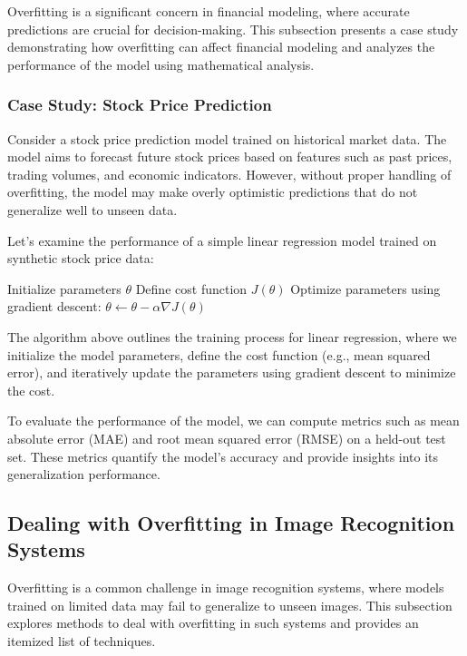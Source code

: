 \documentclass[12pt]{book} %
\begin{document}
Overfitting is a significant concern in financial modeling, where accurate predictions are crucial for decision-making. This subsection presents a case study demonstrating how overfitting can affect financial modeling and analyzes the performance of the model using mathematical analysis.

\subsubsection{Case Study: Stock Price Prediction}

Consider a stock price prediction model trained on historical market data. The model aims to forecast future stock prices based on features such as past prices, trading volumes, and economic indicators. However, without proper handling of overfitting, the model may make overly optimistic predictions that do not generalize well to unseen data.

Let's examine the performance of a simple linear regression model trained on synthetic stock price data:
\FloatBarrier
\begin{algorithm}
\caption{Linear Regression for Stock Price Prediction}\label{alg:linear_regression}
\begin{algorithmic}[1]
\State Initialize parameters $\theta$
\State Define cost function $J(\theta)$
\State Optimize parameters using gradient descent: $\theta \leftarrow \theta - \alpha \nabla J(\theta)$
\end{algorithmic}
\end{algorithm}
\FloatBarrier
The algorithm above outlines the training process for linear regression, where we initialize the model parameters, define the cost function (e.g., mean squared error), and iteratively update the parameters using gradient descent to minimize the cost.

To evaluate the performance of the model, we can compute metrics such as mean absolute error (MAE) and root mean squared error (RMSE) on a held-out test set. These metrics quantify the model's accuracy and provide insights into its generalization performance.

\subsection{Dealing with Overfitting in Image Recognition Systems}

Overfitting is a common challenge in image recognition systems, where models trained on limited data may fail to generalize to unseen images. This subsection explores methods to deal with overfitting in such systems and provides an itemized list of techniques.
\end{document}
